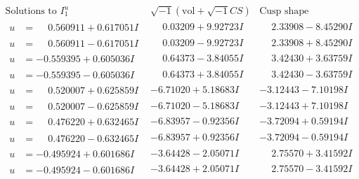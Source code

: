 \documentclass[1p]{elsarticle_modified}
\theoremstyle{definition}
\newcommand{\I}{\sqrt{-1}}
\begin{document}
$$\begin{array}{c|c|c}  
\text{Solutions to }I^u_{1}& \I (\text{vol} + \sqrt{-1}CS) & \text{Cusp shape}\\
 \hline 
\begin{aligned}
u &= \phantom{-}0.560911 + 0.617051 I\end{aligned}
 & \phantom{-}0.03209 + 9.92723 I & \phantom{-}2.33908 - 8.45290 I \\ \hline\begin{aligned}
u &= \phantom{-}0.560911 - 0.617051 I\end{aligned}
 & \phantom{-}0.03209 - 9.92723 I & \phantom{-}2.33908 + 8.45290 I \\ \hline\begin{aligned}
u &= -0.559395 + 0.605036 I\end{aligned}
 & \phantom{-}0.64373 - 3.84055 I & \phantom{-}3.42430 + 3.63759 I \\ \hline\begin{aligned}
u &= -0.559395 - 0.605036 I\end{aligned}
 & \phantom{-}0.64373 + 3.84055 I & \phantom{-}3.42430 - 3.63759 I \\ \hline\begin{aligned}
u &= \phantom{-}0.520007 + 0.625859 I\end{aligned}
 & -6.71020 + 5.18683 I & -3.12443 - 7.10198 I \\ \hline\begin{aligned}
u &= \phantom{-}0.520007 - 0.625859 I\end{aligned}
 & -6.71020 - 5.18683 I & -3.12443 + 7.10198 I \\ \hline\begin{aligned}
u &= \phantom{-}0.476220 + 0.632465 I\end{aligned}
 & -6.83957 - 0.92356 I & -3.72094 + 0.59194 I \\ \hline\begin{aligned}
u &= \phantom{-}0.476220 - 0.632465 I\end{aligned}
 & -6.83957 + 0.92356 I & -3.72094 - 0.59194 I \\ \hline\begin{aligned}
u &= -0.495924 + 0.601686 I\end{aligned}
 & -3.64428 - 2.05071 I & \phantom{-}2.75570 + 3.41592 I \\ \hline\begin{aligned}
u &= -0.495924 - 0.601686 I\end{aligned}
 & -3.64428 + 2.05071 I & \phantom{-}2.75570 - 3.41592 I \\ \hline\begin{aligned}

\end{aligned}
\end{array}$$
\end{document}
